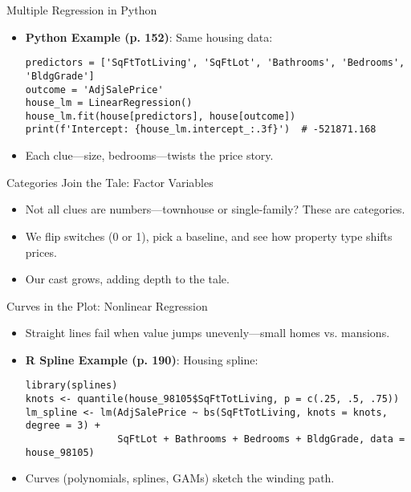\documentclass{beamer}
\begin{document}
\begin{frame}[fragile]{Multiple Regression in Python}
  \begin{itemize}
    \item \textbf{Python Example (p. 152)}: Same housing data:
      \lstset{language=Python}
      \begin{lstlisting}
predictors = ['SqFtTotLiving', 'SqFtLot', 'Bathrooms', 'Bedrooms', 'BldgGrade']
outcome = 'AdjSalePrice'
house_lm = LinearRegression()
house_lm.fit(house[predictors], house[outcome])
print(f'Intercept: {house_lm.intercept_:.3f}')  # -521871.168
      \end{lstlisting}
    \item Each clue—size, bedrooms—twists the price story.
  \end{itemize}
\end{frame}

\begin{frame}{Categories Join the Tale: Factor Variables}
  \begin{itemize}
    \item Not all clues are numbers—townhouse or single-family? These are categories.
    \item We flip switches (0 or 1), pick a baseline, and see how property type shifts prices.
    \item Our cast grows, adding depth to the tale.
  \end{itemize}
\end{frame}

\begin{frame}[fragile]{Curves in the Plot: Nonlinear Regression}
  \begin{itemize}
    \item Straight lines fail when value jumps unevenly—small homes vs. mansions.
    \item \textbf{R Spline Example (p. 190)}: Housing spline:
      \begin{lstlisting}
library(splines)
knots <- quantile(house_98105$SqFtTotLiving, p = c(.25, .5, .75))
lm_spline <- lm(AdjSalePrice ~ bs(SqFtTotLiving, knots = knots, degree = 3) +
                SqFtLot + Bathrooms + Bedrooms + BldgGrade, data = house_98105)
      \end{lstlisting}
    \item Curves (polynomials, splines, GAMs) sketch the winding path.
  \end{itemize}
\end{frame}
\end{document}
